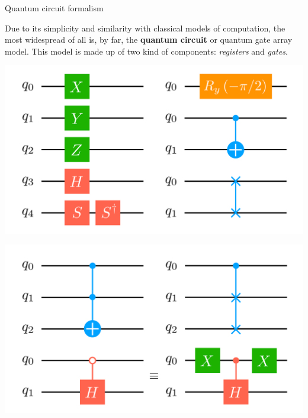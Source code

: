 \documentclass[9pt, handout, aspectratio=169]{beamer}	%
\begin{document}
\begin{frame}{Quantum circuit formalism}

	Due to its simplicity and similarity with classical models of computation, the most widespread of all is, by far, the \textbf{quantum circuit} or quantum gate array model. This model is made up of two kind of components: \emph{registers} and \emph{gates}.

	\begin{multicols}{2}

		\begin{center}
			\includegraphics[width=.40\paperwidth]{Figures/quantum-background/circuit-gates-1}
		\end{center}

		\columnbreak

		\begin{center}
			\includegraphics[width=.40\paperwidth]{Figures/quantum-background/circuit-gates-2}
		\end{center}

	\end{multicols}

\end{frame}
\end{document}
